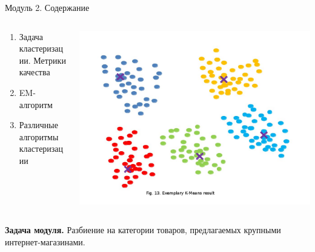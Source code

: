 \documentclass[10pt,a4paper]{beamer}
\begin{document}
\begin{frame}{Модуль 2. Содержание}

\begin{columns}[T]
    \begin{column}{.4\textwidth}
     \begin{block}{}
     	\begin{footnotesize}
     		\begin{enumerate}
     		\item Задача кластеризации. Метрики качества 
			\item EM-алгоритм
			\item Различные алгоритмы кластеризации
     		\end{enumerate}     				
     	\end{footnotesize}
    \end{block}
    \end{column}
    \begin{column}{.55\textwidth}
    \begin{block}{}
    \vspace{-3em}
	\begin{center}
   		\includegraphics[scale=0.15]{images/kemans.jpg}
    \end{center}
    \end{block}
    \end{column}
\end{columns}
  
  {\bf Задача модуля.} Разбиение на категории товаров, предлагаемых крупными интернет-магазинами.

\end{frame}
\end{document}
